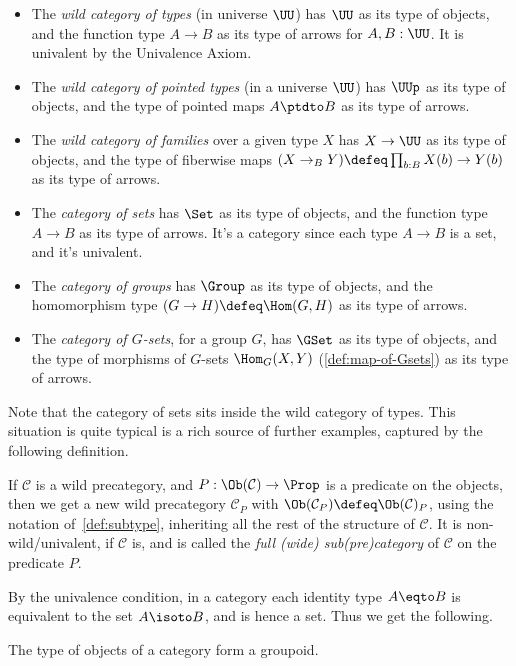 \begin{itemize}
\item
  The \emph{wild category of types} (in universe $\UU$) has $\UU$
  as its type of objects, and the function type $A \to B$ as its type of arrows
  for $A,B :\UU$. It is univalent by the Univalence Axiom.
\item
  The \emph{wild category of pointed types} (in a universe $\UU$) has
  $\UUp$ as its type of objects, and the type of pointed maps $A \ptdto B$ as its type of arrows.
\item
  The \emph{wild category of families} over a given type $X$ has
  $X \to \UU$ as its type of objects, and the type of fiberwise maps
  $(X \to_B Y) \defeq \prod_{b:B}X(b) \to Y(b)$
  as its type of arrows.
\item
  The \emph{category of sets} has $\Set$
  as its type of objects, and the function type $A \to B$ as its type of arrows.
  It's a category since each type $A\to B$ is a set, and it's univalent.
\item
  The \emph{category of groups} has $\Group$
  as its type of objects, and the homomorphism type $(G \to H) \defeq \Hom(G,H)$
  as its type of arrows.
\item
  The \emph{category of $G$-sets}, for a group $G$,
  has $\GSet$ as its type of objects, and the type of morphisms of $G$-sets
  $\Hom_G(X,Y)$ (\cref{def:map-of-Gsets}) as its type of arrows.
\end{itemize}
Note that the category of sets sits inside the wild category of types.
This situation is quite typical is a rich source of further examples,
captured by the following definition.
\begin{definition}\label{def:full-subcat}
  If $\mathcal C$ is a wild precategory, and $P : \Ob(\mathcal C) \to \Prop$
  is a predicate on the objects, then we get a new wild precategory
  $\mathcal C_P$ with $\Ob(\mathcal C_P) \defeq \Ob(\mathcal C)_P$,
  using the notation of~\cref{def:subtype}, inheriting all the rest of the
  structure of $\mathcal C$. It is non-wild/univalent, if $\mathcal C$ is,
  and is called the \emph{full (wide) sub(pre)category}
  of $\mathcal C$ on the predicate $P$.
\end{definition}

By the univalence condition, in a category each identity type $A \eqto B$
is equivalent to the set $A \isoto B$, and is hence a set.
Thus we get the following.
\begin{lemma}\label{lem:obj-gpd}
  The type of objects of a category form a groupoid.
\end{lemma}

